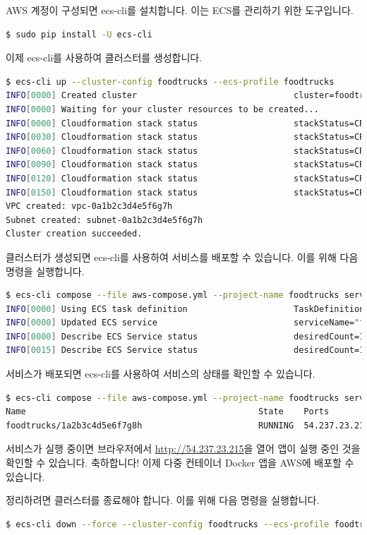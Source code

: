 AWS 계정이 구성되면 ecs-cli를 설치합니다. 이는 ECS를 관리하기 위한 도구입니다.
\begin{lstlisting}[language=bash]
$ sudo pip install -U ecs-cli
\end{lstlisting}

이제 ecs-cli를 사용하여 클러스터를 생성합니다.
\begin{lstlisting}[language=bash]
$ ecs-cli up --cluster-config foodtrucks --ecs-profile foodtrucks
INFO[0000] Created cluster                               cluster=foodtrucks region=us-east-1
INFO[0000] Waiting for your cluster resources to be created...
INFO[0000] Cloudformation stack status                   stackStatus=CREATE_IN_PROGRESS
INFO[0030] Cloudformation stack status                   stackStatus=CREATE_IN_PROGRESS
INFO[0060] Cloudformation stack status                   stackStatus=CREATE_IN_PROGRESS
INFO[0090] Cloudformation stack status                   stackStatus=CREATE_IN_PROGRESS
INFO[0120] Cloudformation stack status                   stackStatus=CREATE_IN_PROGRESS
INFO[0150] Cloudformation stack status                   stackStatus=CREATE_IN_PROGRESS
VPC created: vpc-0a1b2c3d4e5f6g7h
Subnet created: subnet-0a1b2c3d4e5f6g7h
Cluster creation succeeded.
\end{lstlisting}

클러스터가 생성되면 ecs-cli를 사용하여 서비스를 배포할 수 있습니다. 이를 위해 다음 명령을 실행합니다.
\begin{lstlisting}[language=bash]
$ ecs-cli compose --file aws-compose.yml --project-name foodtrucks service up
INFO[0000] Using ECS task definition                     TaskDefinition="foodtrucks:1"
INFO[0000] Updated ECS service                           serviceName="foodtrucks" status="ACTIVE"
INFO[0000] Describe ECS Service status                   desiredCount=1 runningCount=1 serviceName="foodtrucks"
INFO[0015] Describe ECS Service status                   desiredCount=1 runningCount=1 serviceName="foodtrucks"
\end{lstlisting}

서비스가 배포되면 ecs-cli를 사용하여 서비스의 상태를 확인할 수 있습니다.
\begin{lstlisting}[language=bash]
$ ecs-cli compose --file aws-compose.yml --project-name foodtrucks service ps
Name                                              State    Ports                   TaskDefinition
foodtrucks/1a2b3c4d5e6f7g8h                       RUNNING  54.237.23.215:80->80/tcp  foodtrucks:1
\end{lstlisting}

서비스가 실행 중이면 브라우저에서 \url{http://54.237.23.215}을 열어 앱이 실행 중인 것을 확인할 수 있습니다. 축하합니다! 이제 다중 컨테이너 Docker 앱을 AWS에 배포할 수 있습니다.

정리하려면 클러스터를 종료해야 합니다. 이를 위해 다음 명령을 실행합니다.
\begin{lstlisting}[language=bash]
$ ecs-cli down --force --cluster-config foodtrucks --ecs-profile foodtrucks
\end{lstlisting}
